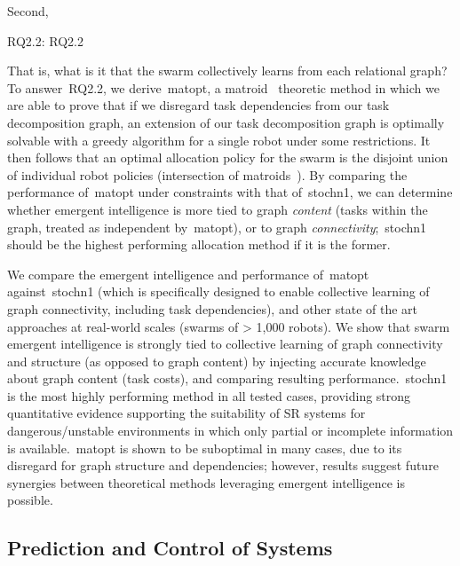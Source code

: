 Second, 

\medskip\noindent
\gls{RQ2.2}: \glsdesc{RQ2.2}
\medskip

\noindent
That is, what is it that the swarm collectively learns from each relational
graph?  To answer~\gls{RQ2.2}, we derive~\gls{matopt}, a
matroid~\cite{Tutte1959,Whitney1935,Oxley2006} theoretic method in which we are
able to prove that if we disregard task dependencies from our task decomposition
graph, an extension of our task decomposition graph is optimally solvable with a
greedy algorithm for a single robot under some restrictions. It then follows
that an optimal allocation policy for the swarm is the disjoint union of
individual robot policies (intersection of matroids~\cite{Williams2017}). By
comparing the performance of~\gls{matopt} under constraints with that
of~\gls{stochn1}, we can determine whether emergent intelligence is more tied
to graph \emph{content} (tasks within the graph, treated as independent
by~\gls{matopt}), or to graph \emph{connectivity};~\gls{stochn1} should be the
highest performing allocation method if it is the former.

We compare the emergent intelligence and performance of~\gls{matopt}
against~\gls{stochn1} (which is specifically designed to enable collective
learning of graph connectivity, including task dependencies), and other state of
the art approaches at real-world scales (swarms of > 1,000 robots). We show that
swarm emergent intelligence is strongly tied to collective learning of graph
connectivity and structure (as opposed to graph content) by injecting accurate
knowledge about graph content (task costs), and comparing resulting
performance.~\gls{stochn1} is the most highly performing method in all tested
cases, providing strong quantitative evidence supporting the suitability of SR
systems for dangerous/unstable environments in which only partial or incomplete
information is available.~\gls{matopt} is shown to be suboptimal in many cases,
due to its disregard for graph structure and dependencies; however, results
suggest future synergies between theoretical methods leveraging emergent
intelligence is possible.

\subsection{Prediction and Control of  Systems}


